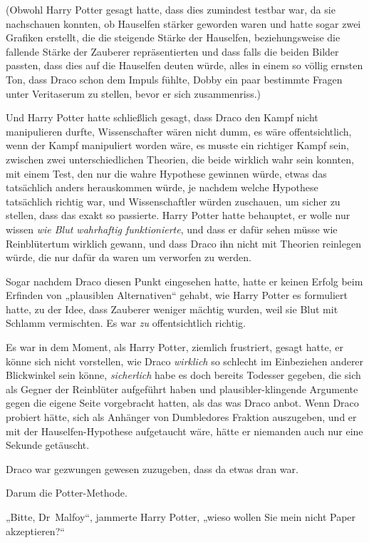 {(Obwohl Harry Potter gesagt hatte, dass dies zumindest testbar war, da sie nachschauen konnten, ob Hauselfen stärker geworden waren und hatte sogar zwei Grafiken erstellt, die die steigende Stärke der Hauselfen, beziehungsweise die fallende Stärke der Zauberer repräsentierten und dass falls die beiden Bilder passten, dass dies auf die Hauselfen deuten würde, alles in einem so völlig ernsten Ton, dass Draco schon dem Impuls fühlte, Dobby ein paar bestimmte Fragen unter Veritaserum zu stellen, bevor er sich zusammenriss.)

Und Harry Potter hatte schließlich gesagt, dass Draco den Kampf nicht manipulieren durfte, Wissenschafter wären nicht dumm, es wäre offentsichtlich, wenn der Kampf manipuliert worden wäre, es musste ein richtiger Kampf sein, zwischen zwei unterschiedlichen Theorien, die beide wirklich wahr sein konnten, mit einem Test, den nur die wahre Hypothese gewinnen würde, etwas das tatsächlich anders herauskommen würde, je nachdem welche Hypothese tatsächlich richtig war, und Wissenschaftler würden zuschauen, um sicher zu stellen, dass das exakt so passierte. Harry Potter hatte behauptet, er wolle nur wissen \emph{wie Blut wahrhaftig funktionierte}, und dass er dafür sehen müsse wie Reinblütertum wirklich gewann, und dass Draco ihn nicht mit Theorien reinlegen würde, die nur dafür da waren um verworfen zu werden.

Sogar nachdem Draco diesen Punkt eingesehen hatte, hatte er keinen Erfolg beim Erfinden von „plausiblen Alternativen“ gehabt, wie Harry Potter es formuliert hatte, zu der Idee, dass Zauberer weniger mächtig wurden, weil sie Blut mit Schlamm vermischten. Es war \emph{zu} offentsichtlich richtig.

Es war in dem Moment, als Harry Potter, ziemlich frustriert, gesagt hatte, er könne sich nicht vorstellen, wie Draco \emph{wirklich} so schlecht im Einbeziehen anderer Blickwinkel sein könne, \emph{sicherlich} habe es doch bereits Todesser gegeben, die sich als Gegner der Reinblüter aufgeführt haben und plausibler-klingende Argumente gegen die eigene Seite vorgebracht hatten, als das was Draco anbot. Wenn Draco probiert hätte, sich als Anhänger von Dumbledores Fraktion auszugeben, und er mit der Hauselfen-Hypothese aufgetaucht wäre, hätte er niemanden auch nur eine Sekunde getäuscht.

Draco war gezwungen gewesen zuzugeben, dass da etwas dran war.

Darum die Potter-Methode.

„Bitte, Dr~Malfoy“, jammerte Harry Potter, „wieso wollen Sie mein nicht Paper akzeptieren?“

}
